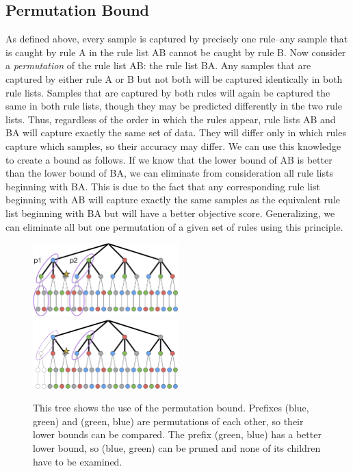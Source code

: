 \subsection{Permutation Bound}

As defined above, every sample is captured by precisely one rule--any sample that is caught by rule A in the rule list AB cannot be caught by rule B. 
Now consider a \textit{permutation} of the rule list AB: the rule list BA.
Any samples that are captured by either rule A or B but not both will be captured identically in both rule lists.
Samples that are captured by both rules will again be captured the same in both rule lists, though they may be predicted differently in the two rule lists.
Thus, regardless of the order in which the rules appear, rule lists AB and BA will capture exactly the same set of data.
They will differ only in which rules capture which samples, so their accuracy may differ. 
We can use this knowledge to create a bound as follows.
If we know that the lower bound of AB is better than the lower bound of BA, we can eliminate from consideration all rule lists beginning with BA.
This is due to the fact that any corresponding rule list beginning with AB will capture exactly the same samples as the equivalent rule list beginning with BA but will have a better objective score.
Generalizing, we can eliminate all but one permutation of a given set of rules using this principle.

\begin{figure}
\includegraphics[width=0.5\textwidth]{figs/ela_branch-and-bound-permutations.png}
\includegraphics[width=0.5\textwidth]{figs/ela_branch-and-bound-permutations-pruned.png}
\caption[Permutation bound]{This tree shows the use of the permutation bound. Prefixes (blue, green) and (green, blue) are permutations of each other, so their lower bounds can be compared. The prefix (green, blue) has a better lower bound, so (blue, green) can be pruned and none of its children have to be examined.
\label{fig:permutation-bound}}
\end{figure}


